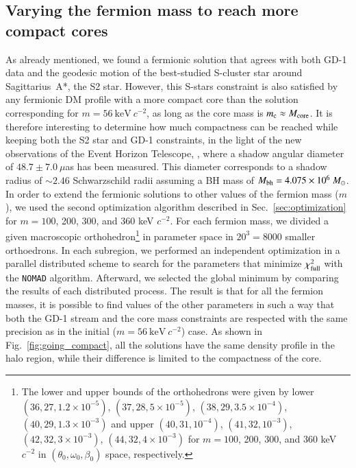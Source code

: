 \documentclass[twocolumn]{aa}
\begin{document}
\subsection{Varying the fermion mass to reach more compact cores}
As already mentioned, we found a fermionic solution that agrees with both GD-1 data and
the geodesic motion of the best-studied S-cluster star around Sagittarius~A*, the S2 star.
However, this S-stars constraint is also satisfied by any fermionic DM profile
with a more compact core than the solution corresponding for $m=56~\mathrm{keV}~c^{-2}$,
as long as the core mass is $m_\mathrm{c}\approx M_{\rm{core}}$.
It is therefore interesting to determine how much compactness can be reached
while keeping both the S2 star and \hbox{GD-1} constraints, in the light of the new observations
of the Event Horizon Telescope, \cite{EHT_image}, where a shadow angular diameter of $48.7\pm7.0~\mu$as
has been measured. This diameter corresponds to a shadow radius of $\sim 2.46$ Schwarzschild radii assuming
a BH mass of $M_{\rm{bh}}=4.075\times10^6~M_\odot$.
In order to extend the fermionic solutions to other values of the fermion mass ($m$), we used the second optimization algorithm described in Sec.~\ref{sec:optimization} for $m=100$, 200, 300, and 360 keV $c^{-2}$. For each fermion mass, we divided a given macroscopic orthohedron\footnote{The lower and upper bounds of the orthohedrons were given by
lower $(36, 27, 1.2\times10^{-5})$, $(37, 28, 5\times10^{-5})$, $(38, 29, 3.5\times10^{-4})$, $(40, 29, 1.3\times10^{-3})$ and
upper $(40, 31, 10^{-4})$, $(41, 32, 10^{-3})$, $(42, 32, 3\times10^{-3})$, $(44, 32, 4\times10^{-3})$ for $m=100$, 200, 300, and 360 keV $c^{-2}$ in $(\theta_0, \omega_0, \beta_0)$ space, respectively.}
in parameter space in $20^3=8000$ smaller orthoedrons. In each subregion, we performed an independent optimization in a parallel distributed scheme to search for the parameters that minimize $\chi^2_{\rm{full}}$ with the \texttt{NOMAD} algorithm. Afterward, we selected the global minimum by comparing the results of each distributed process.
The result is that for all the fermion masses, it is possible to find values of the other parameters in such a way that both the GD-1 stream and the core mass constraints  are respected with the same precision as in the initial ($m=56~\mathrm{keV}~c^{-2}$) case. As shown in Fig.~\ref{fig:going_compact}, all the solutions have the same density profile in the halo region, while their difference is limited to the compactness of the core.
\end{document}
